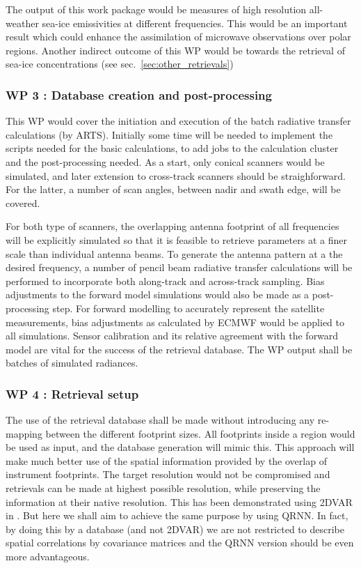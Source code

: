 \documentclass[12pt,oneside,a4paper]{article}
\begin{document}
The output of this work package would be measures of high resolution all-weather sea-ice emissivities at different frequencies. This would be an important result which could enhance the assimilation of microwave observations over polar regions. Another indirect outcome of this WP would be towards the retrieval of sea-ice concentrations (see sec.~\ref{sec:other_retrievals})  

 

	
\subsubsection*{WP 3 : Database creation and post-processing}
%
\label{sec:database}	
This WP would cover the initiation and execution of the batch radiative transfer calculations (by ARTS). Initially some time will be needed to implement the scripts needed for the basic calculations, to add jobs to the calculation cluster and the post-processing needed. As a start, only conical scanners would be simulated, and later extension to cross-track scanners should be straighforward. For the latter, a number of scan angles, between nadir and swath edge, will be covered.

For both type of scanners, the overlapping antenna footprint of all frequencies will be explicitly simulated so that it is feasible to retrieve parameters at a finer scale than individual antenna beams. To generate the antenna pattern at a the desired frequency, a number of pencil beam radiative transfer calculations will be performed to incorporate both along-track and across-track sampling. Bias adjustments to the forward model simulations would also be made  as a post-processing step. For forward modelling to accurately represent the satellite measurements, bias adjustments as calculated by ECMWF would be applied to all simulations. Sensor calibration and its relative agreement with the forward model are vital for the success of the retrieval database. 
The WP output shall be batches of simulated radiances.

\subsubsection*{WP 4 : Retrieval setup}
%
\label{sec:setup}
The use of the retrieval database shall be made without introducing any re-mapping between the different footprint sizes. All footprints inside a region would be used as input, and the database generation will mimic this. This approach will make much better use of the spatial information provided by the overlap of instrument footprints. The target resolution would not be compromised and retrievals can be made at highest possible resolution, while preserving the information at their native resolution. This has been demonstrated using 2DVAR in \citep{duncan:onthe:19}. But here we shall aim to achieve the same purpose by using QRNN. In fact, by doing this by a database (and not 2DVAR) we are not restricted to describe spatial correlations by covariance matrices and the QRNN version should be even more advantageous.
\end{document}
